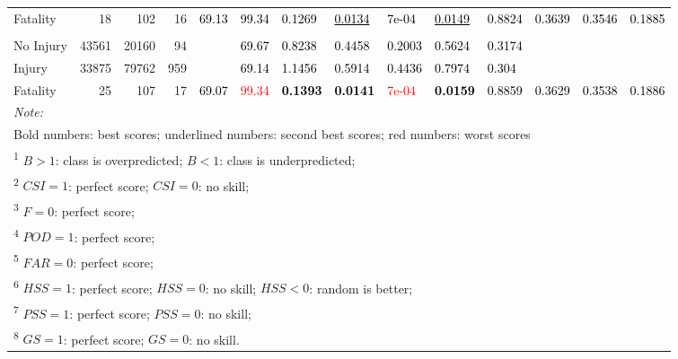 \documentclass[]{elsarticle} %
\begin{document}
\begin{table}[!h]
{{\begin{tabular}[t]{lrrrllllllllll}
Fatality & 18 & 102 & 16 & \multirow{-3}{*}{\raggedright\arraybackslash \textcolor{black}{69.13}} & \textcolor{black}{99.34} & \textcolor{black}{0.1269} & \textcolor{black}{\underline{0.0134}} & \textcolor{black}{7e-04} & \textcolor{black}{\underline{0.0149}} & \textcolor{black}{0.8824} & \multirow{-3}{*}{\raggedright\arraybackslash \textcolor{black}{0.3639}} & \multirow{-3}{*}{\raggedright\arraybackslash \textcolor{black}{0.3546}} & \multirow{-3}{*}{\raggedright\arraybackslash \textcolor{black}{0.1885}}\\
\cmidrule{1-14}
\addlinespace[0.3em]
\multicolumn{14}{l}{\textbf{Model 4 Ensemble}}\\
\hspace{1em}No Injury & 43561 & 20160 & 94 &  & \textcolor{black}{69.67} & \textcolor{black}{0.8238} & \textcolor{black}{0.4458} & \textcolor{black}{0.2003} & \textcolor{black}{0.5624} & \textcolor{black}{0.3174} &  &  & \\

\hspace{1em}Injury & 33875 & 79762 & 959 &  & \textcolor{black}{69.14} & \textcolor{black}{1.1456} & \textcolor{black}{0.5914} & \textcolor{black}{0.4436} & \textcolor{black}{0.7974} & \textcolor{black}{0.304} &  &  & \\

Fatality & 25 & 107 & 17 & \multirow{-3}{*}{\raggedright\arraybackslash \textcolor{black}{69.07}} & \textcolor{red}{99.34} & \textcolor{black}{\textbf{0.1393}} & \textcolor{black}{\textbf{0.0141}} & \textcolor{red}{7e-04} & \textcolor{black}{\textbf{0.0159}} & \textcolor{black}{0.8859} & \multirow{-3}{*}{\raggedright\arraybackslash \textcolor{black}{0.3629}} & \multirow{-3}{*}{\raggedright\arraybackslash \textcolor{black}{0.3538}} & \multirow{-3}{*}{\raggedright\arraybackslash \textcolor{black}{0.1886}}\\
\bottomrule
\multicolumn{14}{l}{\textit{Note: }}\\
\multicolumn{14}{l}{Bold numbers: best scores; underlined numbers: second best scores; red numbers: worst scores}\\
\multicolumn{14}{l}{\textsuperscript{1} $B>1$: class is overpredicted; $B<1$: class is underpredicted; }\\
\multicolumn{14}{l}{\textsuperscript{2} $CSI = 1$: perfect score; $CSI = 0$: no skill; }\\
\multicolumn{14}{l}{\textsuperscript{3} $F = 0$: perfect score; }\\
\multicolumn{14}{l}{\textsuperscript{4} $POD = 1$: perfect score; }\\
\multicolumn{14}{l}{\textsuperscript{5} $FAR = 0$: perfect score; }\\
\multicolumn{14}{l}{\textsuperscript{6} $HSS = 1$: perfect score; $HSS = 0$: no skill; $HSS < 0$: random is better; }\\
\multicolumn{14}{l}{\textsuperscript{7} $PSS = 1$: perfect score; $PSS = 0$: no skill; }\\
\multicolumn{14}{l}{\textsuperscript{8} $GS = 1$: perfect score; $GS = 0$: no skill.}\\
\end{tabular}}}
\end{table}
\end{document}
